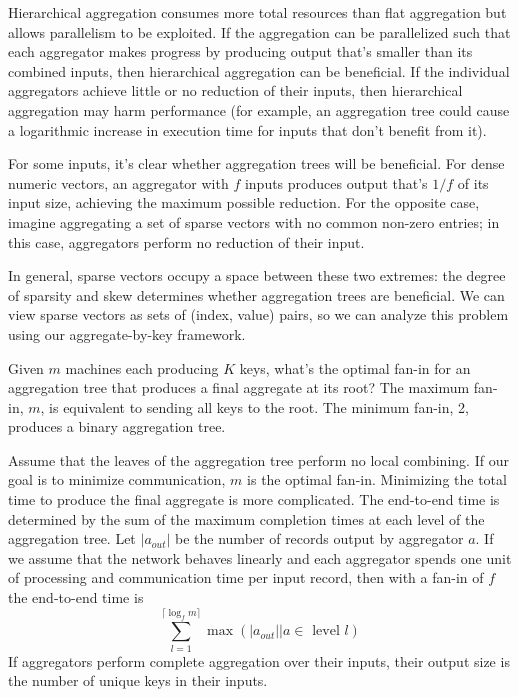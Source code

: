 \documentclass[12pt]{article}
\begin{document}
Hierarchical aggregation consumes more total resources than flat aggregation
but allows parallelism to be exploited.  If the aggregation can be parallelized
such that each aggregator makes progress by producing output that's smaller
than its combined inputs, then hierarchical aggregation can be beneficial.
If the individual aggregators achieve little or no reduction of their inputs,
then hierarchical aggregation may harm performance (for example, an
aggregation tree could cause a logarithmic increase in execution time for
inputs that don't benefit from it).



For some inputs, it's clear whether aggregation trees will be beneficial.
For dense numeric vectors, an aggregator with $f$ inputs produces output
that's $1/f$ of its input size, achieving the maximum possible reduction.
For the opposite case, imagine aggregating a set of sparse vectors with
no common non-zero entries; in this case, aggregators perform no reduction of
their input.

In general, sparse vectors occupy a space between these two extremes: the
degree of sparsity and skew determines whether aggregation trees are
beneficial.  We can view sparse vectors as sets of (index, value) pairs, so we
can analyze this problem using our aggregate-by-key framework.

Given $m$ machines each producing $K$ keys, what's the optimal fan-in for an
aggregation tree that produces a final aggregate at its root?  The maximum
fan-in, $m$, is equivalent to sending all keys to the root.  The minimum
fan-in, 2, produces a binary aggregation tree.

Assume that the leaves of the aggregation tree perform no local combining.
If our goal is to minimize communication, $m$ is the optimal fan-in.
Minimizing the total time to produce the final aggregate is more complicated.
The end-to-end time is determined by the sum of the maximum completion times
at each level of the aggregation tree.  Let $|a_{out}|$ be the number of
records output by aggregator $a$.  If we assume that the network behaves
linearly and each aggregator spends one unit of processing and communication
time per input record, then with a fan-in of $f$ the end-to-end time is
\[
    \sum_{l=1}^{\lceil\log_fm\rceil}
        \max
        \left(
            |a_{out}| | a \in \text{ level } l
        \right)
\]
If aggregators perform complete aggregation over their inputs, their output
size is the number of unique keys in their inputs.
\end{document}
